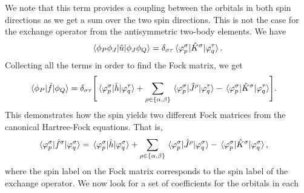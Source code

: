             We note that this term provides a coupling between the orbitals in
            both spin directions as we get a sum over the two spin directions.
            This is not the case for the exchange operator from the
            antisymmetric two-body elements.
            We have
            \begin{align}
                \mel*{\phi_P\phi_J}{
                    \hat{u}
                }{\phi_J\phi_Q}
                =
                \delta_{\sigma\tau}
                \mel*{\varphi^{\sigma}_{p}}{
                    \hat{K}^{\sigma}
                }{\varphi^{\tau}_{q}}.
            \end{align}
            Collecting all the terms in order to find the Fock matrix, we get
            \begin{align}
                \mel*{\phi_P}{\hat{f}}{\phi_Q}
                &=
                \delta_{\sigma\tau}
                \Biggl[
                    \mel*{\varphi^{\sigma}_{p}}{
                        \hat{h}
                    }{\varphi^{\tau}_{q}}
                    +
                    \sum_{\rho \in \left\{ \alpha, \beta \right\}}
                    \mel*{\varphi^{\sigma}_{p}}{
                        \hat{J}^{\rho}
                    }{\varphi^{\tau}_{q}}
                    -
                    \mel*{\varphi^{\sigma}_{p}}{
                        \hat{K}^{\sigma}
                    }{\varphi^{\tau}_{q}}
                \Biggr].
            \end{align}
            This demonstrates how the spin yields two different Fock matrices
            from the canonical Hartree-Fock equations.
            That is,
            \begin{align}
                \mel*{\varphi^{\sigma}_{p}}{
                    \hat{f}^{\sigma}
                }{\varphi^{\sigma}_{q}}
                &=
                \mel*{\varphi^{\sigma}_{p}}{
                    \hat{h}
                }{\varphi^{\sigma}_{q}}
                +
                \sum_{\rho \in \left\{ \alpha, \beta \right\}}
                \mel*{\varphi^{\sigma}_{p}}{
                    \hat{J}^{\rho}
                }{\varphi^{\sigma}_{q}}
                -
                \mel*{\varphi^{\sigma}_{p}}{
                    \hat{K}^{\sigma}
                }{\varphi^{\sigma}_{q}},
            \end{align}
            where the spin label on the Fock matrix corresponds to the spin
            label of the exchange operator.
            We now look for a set of coefficients for the orbitals in each
